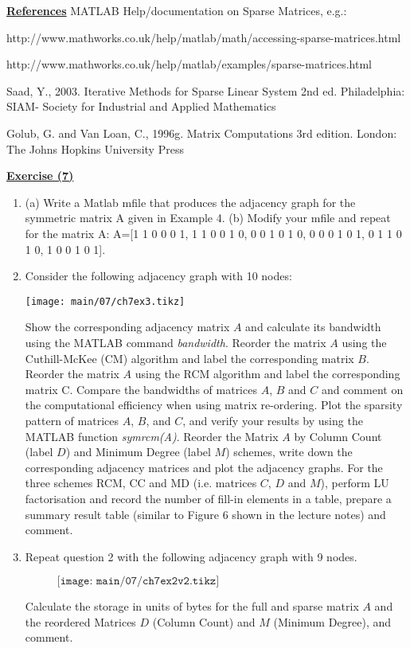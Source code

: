   \vskip 20pt
  \noindent
  {\bf\underline {References}}
  \vskip 10pt
  \noindent
  MATLAB Help/documentation on Sparse Matrices, e.g.:
  
  http://www.mathworks.co.uk/help/matlab/math/accessing-sparse-matrices.html
  
  http://www.mathworks.co.uk/help/matlab/examples/sparse-matrices.html
  
  
  \noindent
  Saad, Y., 2003. Iterative Methods for Sparse Linear System 2nd ed. Philadelphia:
  SIAM- Society for Industrial and Applied Mathematics
  
  \noindent
  Golub, G. and Van Loan, C., 1996g. Matrix Computations 3rd edition. London: The
  Johns Hopkins University Press
  
  \newpage
  
  {\bf\underline {Exercise (7)}}
  
  \vskip 4pt
  \noindent
  \begin{enumerate}
  \item (a) Write a Matlab mfile that produces the adjacency graph for the
  symmetric matrix A given in Example 4. (b) Modify your mfile and repeat for the 
  matrix A:
  A=[1 1 0 0 0 1, 1 1 0 0 1 0, 0 0 1 0 1 0, 0 0 0 1 0 1, 0 1 1 0 1 0, 1 0 0 1 0 1].
  \vskip 2pt
  \item {Consider the following adjacency graph with 10 nodes:
  \vskip -6pt
  \begin{table}[H]
  \hspace*{20mm} \texttt{[image: main/07/ch7ex3.tikz]}
  \end{table}
  \parskip -10pt
  \noindent
  Show the corresponding adjacency matrix $A$ and calculate its bandwidth using
  the MATLAB command \emph{bandwidth}. Reorder the matrix $A$ using the Cuthill-McKee (CM)
  algorithm and label the corresponding matrix $B$. Reorder the matrix $A$ using
  the RCM algorithm and label the corresponding matrix C. Compare the bandwidths
  of matrices $A$, $B$ and $C$ and comment on the computational efficiency when
  using matrix re-ordering. Plot the sparsity pattern of matrices $A$, $B$, and
  $C$, and verify your results by using the MATLAB function {\it symrcm(A)}.
  Reorder the Matrix $A$ by Column Count (label $D$) and Minimum Degree (label
  $M$) schemes, write down the corresponding adjacency matrices and plot the
  adjacency graphs. For the three schemes RCM, CC and MD (i.e. matrices $C$, $D$
  and $M$), perform LU factorisation and record the number of fill-in elements in
  a table, prepare a summary result table (similar to Figure 6 shown in the
  lecture notes) and comment.}
  \vskip 4pt
  \item Repeat question 2 with the following adjacency graph with 9 nodes.
  \begin{figure}[H]
  \hspace*{20mm}$\texttt{[image: main/07/ch7ex2v2.tikz]}$
  \end{figure}
  \parskip -10pt
  \noindent
  Calculate the storage in units of bytes for the full and sparse matrix $A$ and
  the reordered Matrices $D$ (Column Count) and $M$ (Minimum Degree), and comment.
  \end{enumerate}
  
  